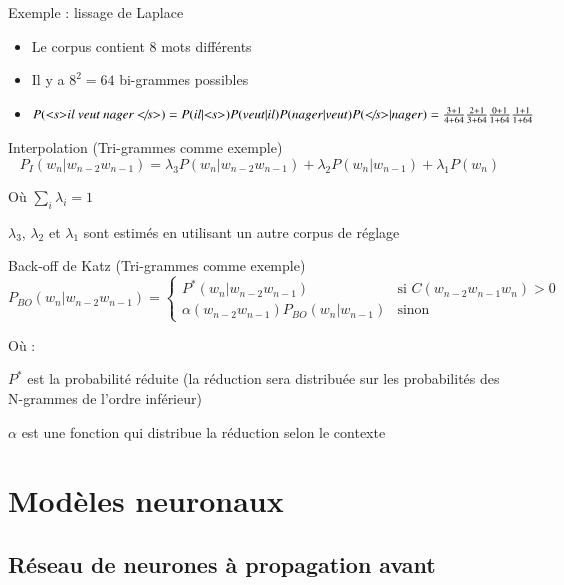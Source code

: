 \documentclass{KodeBook}
\begin{document}
\begin{exampleblock}{Exemple : lissage de Laplace}
	\begin{itemize}
		\item Le corpus contient 8 mots différents
		\item Il y a  $8^2 = 64$ bi-grammes possibles
		\item $P(\text{\textit{\textless s\textgreater il veut nager \textless/s\textgreater}}) = 
		P(il|\text{\textit{\textless s\textgreater}}) P(veut|il) P(nager|veut)  P(\text{\textit{\textless/s\textgreater}}|nager) = 
		\frac{3 + 1}{4 + 64} \frac{2 + 1}{3 + 64} \frac{0 + 1}{1 + 64} \frac{1 + 1}{1 + 64} $
	\end{itemize}
\end{exampleblock}

\begin{block}{Interpolation (Tri-grammes comme exemple)}
	\[%
	P_{I}(w_n | w_{n-2} w_{n-1}) = 
	\lambda_3 P(w_n | w_{n-2} w_{n-1}) 
	+ \lambda_2 P(w_n | w_{n-1}) 
	+ \lambda_1 P(w_n) 
	\]
	
	Où $\sum_i \lambda_i = 1$
	
	$\lambda_3$, $\lambda_2$ et $\lambda_1$ sont estimés en utilisant un autre corpus de réglage
\end{block}

\begin{block}{Back-off de Katz (Tri-grammes comme exemple)}
	\[%
	P_{BO}(w_n | w_{n-2} w_{n-1}) = 
	\begin{cases}
	P^*(w_n | w_{n-2} w_{n-1}) & \text{si } C(w_{n-2} w_{n-1} w_n) > 0 \\
	\alpha(w_{n-2} w_{n-1}) P_{BO}(w_n | w_{n-1}) & \text{sinon}
	\end{cases}
	\]
	
	Où : 
	
	$P^*$ est la probabilité réduite (la réduction sera distribuée sur les probabilités des N-grammes de l'ordre inférieur)
	
	$\alpha$ est une fonction qui distribue la réduction selon le contexte
\end{block}

\section{Modèles neuronaux}

\subsection{Réseau de neurones à propagation avant}
\end{document}
